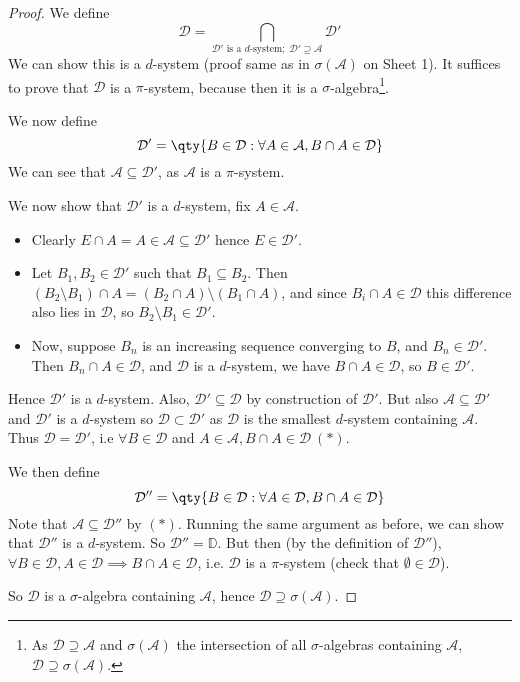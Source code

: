 \begin{proof}
	We define
	\[ \mathcal D = \bigcap_{\mathcal D' \text{ is a } d \text{-system};\; \mathcal D' \supseteq \mathcal A} \mathcal D' \]
	We can show this is a $d$-system (proof same as in $\sigma(\mathcal{A})$ on Sheet 1).
	It suffices to prove that $\mathcal D$ is a $\pi$-system, because then it is a $\sigma$-algebra\footnote{As $\mathcal{D} \supseteq \mathcal{A}$ and $\sigma(\mathcal{A})$ the intersection of all $\sigma$-algebras containing $\mathcal{A}$, $\mathcal{D} \supseteq \sigma(\mathcal{A})$.}.

	We now define
	\[ \mathcal D' = \qty{B \in \mathcal D : \forall A \in \mathcal A, B \cap A \in \mathcal D} \]
	We can see that $\mathcal A \subseteq \mathcal{D}'$, as $\mathcal A$ is a $\pi$-system.

	We now show that $\mathcal D'$ is a $d$-system, fix $A \in \mathcal{A}$.
	\begin{itemize}
		\item Clearly $E \cap A = A \in \mathcal A \subseteq \mathcal D'$ hence $E \in \mathcal D'$.
		\item Let $B_1, B_2 \in \mathcal D'$ such that $B_1 \subseteq B_2$.
		Then $(B_2 \setminus B_1) \cap A = (B_2 \cap A) \setminus (B_1 \cap A)$, and since $B_i \cap A \in \mathcal D$ this difference also lies in $\mathcal D$, so $B_2 \setminus B_1 \in \mathcal D'$.
		\item Now, suppose $B_n$ is an increasing sequence converging to $B$, and $B_n \in \mathcal D'$.
		Then $B_n \cap A \in \mathcal D$, and $\mathcal D$ is a $d$-system, we have $B \cap A \in \mathcal D$, so $B \in \mathcal D'$.
	\end{itemize}

	Hence $\mathcal D'$ is a $d$-system.
	Also, $\mathcal D' \subseteq \mathcal D$ by construction of $\mathcal D'$.
	But also $\mathcal{A} \subseteq \mathcal{D}'$ and $\mathcal{D}'$ is a $d$-system so $\mathcal{D} \subset \mathcal{D}'$ as $\mathcal{D}$ is the smallest $d$-system containing $\mathcal{A}$.
	Thus $\mathcal D = \mathcal D'$, i.e $\forall B \in \mathcal{D}$ and $A \in \mathcal{A}, B \cap A \in \mathcal{D} \ (\ast)$.

	We then define
	\[ \mathcal D'' = \qty{B \in \mathcal D : \forall A \in \mathcal D, B \cap A \in \mathcal D} \]
	Note that $\mathcal A \subseteq \mathcal D''$ by $(\ast)$.
	Running the same argument as before, we can show that $\mathcal D''$ is a $d$-system. So $\mathcal{D}'' = \mathbb{D}$.
	But then (by the definition of $\mathcal{D}''$), $\forall B \in \mathcal{D}, A \in \mathcal{D} \implies B \cap A \in \mathcal{D}$, i.e. $\mathcal{D}$ is a $\pi$-system (check that $\emptyset \in \mathcal{D}$).

	So $\mathcal{D}$ is a $\sigma$-algebra containing $\mathcal{A}$, hence $\mathcal{D} \supseteq \sigma(\mathcal{A})$.
\end{proof}

